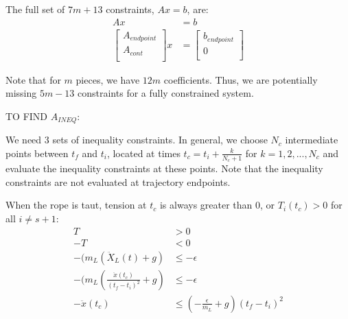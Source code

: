 \documentclass[11pt]{article}
\begin{document}
 
 
 
The full set of $7m+13$ constraints, $Ax = b$, are:
\begin{align}
\nonumber Ax &= b \\
\label{eqn: Akeyframes} 
\begin{bmatrix}
A_{endpoint} \\
A_{cont} \\
 \end{bmatrix}
 x 
& = 
 \begin{bmatrix}
b_{endpoint} \\
0 \\
 \end{bmatrix} 
\end{align}

Note that for $m$ pieces, we have $12m$ coefficients. Thus, we are potentially missing $5m-13$ constraints for a fully constrained system.




\mbox{} \newline
\mbox{} \newline
TO FIND $A_{INEQ}$:
 
We need 3 sets of inequality constraints. In general, we choose $N_c$ intermediate points between $t_f$ and $t_i$, located at times $t_c = t_i+\frac{k}{N_c+1}$ for $k = 1, 2, ..., N_c$ and evaluate the inequality constraints at these points. Note that the inequality constraints are not evaluated at trajectory endpoints. 

\mbox{} \newline
When the rope is taut, tension at $t_c$ is always greater than 0, or $T_i(t_c) > 0$ for all $i \ne s+1$:
\begin{align*}
T &> 0 \\
-T &< 0 \\
-(m_L (\ddot{X}_L(t)+g) &\le -\epsilon \\
-(m_L (\frac{ \ddot{x}(t_c) }{(t_f - t_i)^2}+g) &\le -\epsilon \\
-\ddot{x}(t_c) &\le  (-\frac{ \epsilon }{m_L} + g ) (t_f-t_i)^2 \\
\end{align*}
 
\end{document}

